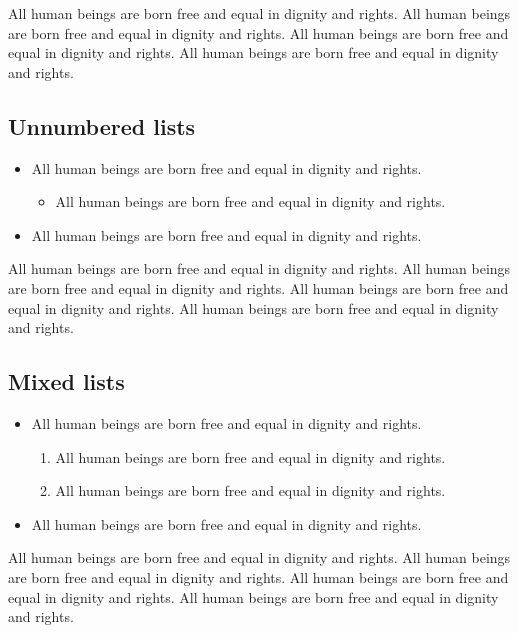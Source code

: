 \documentclass[
  ngerman,
  american,
  ]{scrartcl}
\providecommand{\tightlist}{%
  \setlength{\itemsep}{0pt}\setlength{\parskip}{0pt}}
\begin{document}
All human beings are born free and equal in dignity and rights. All
human beings are born free and equal in dignity and rights. All human
beings are born free and equal in dignity and rights. All human beings
are born free and equal in dignity and rights.

\subsection{Unnumbered lists}\label{unnumbered-lists}

\begin{itemize}
\tightlist
\item
  All human beings are born free and equal in dignity and rights.

  \begin{itemize}
  \tightlist
  \item
    All human beings are born free and equal in dignity and rights.
  \end{itemize}
\item
  All human beings are born free and equal in dignity and rights.
\end{itemize}

All human beings are born free and equal in dignity and rights. All
human beings are born free and equal in dignity and rights. All human
beings are born free and equal in dignity and rights. All human beings
are born free and equal in dignity and rights.

\subsection{Mixed lists}\label{mixed-lists}

\begin{itemize}
\tightlist
\item
  All human beings are born free and equal in dignity and rights.

  \begin{enumerate}
  \def\labelenumi{\arabic{enumi}.}
  \tightlist
  \item
    All human beings are born free and equal in dignity and rights.
  \item
    All human beings are born free and equal in dignity and rights.
  \end{enumerate}
\item
  All human beings are born free and equal in dignity and rights.
\end{itemize}

All human beings are born free and equal in dignity and rights. All
human beings are born free and equal in dignity and rights. All human
beings are born free and equal in dignity and rights. All human beings
are born free and equal in dignity and rights.
\end{document}
